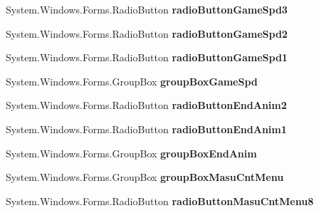 \begin{DoxyCompactItemize}
System.\+Windows.\+Forms.\+Radio\+Button {\bfseries radio\+Button\+Game\+Spd3}
\item 
\mbox{\label{class_reversi4color_form_1_1_setting_form_a2f306eccbb224464568bc234533b2216}} 
System.\+Windows.\+Forms.\+Radio\+Button {\bfseries radio\+Button\+Game\+Spd2}
\item 
\mbox{\label{class_reversi4color_form_1_1_setting_form_aeb1a9c682bde9ee4d1ff34ac0549de87}} 
System.\+Windows.\+Forms.\+Radio\+Button {\bfseries radio\+Button\+Game\+Spd1}
\item 
\mbox{\label{class_reversi4color_form_1_1_setting_form_a9005cda7371c11f4fc95868552e46cc9}} 
System.\+Windows.\+Forms.\+Group\+Box {\bfseries group\+Box\+Game\+Spd}
\item 
\mbox{\label{class_reversi4color_form_1_1_setting_form_a5a00fe38d85270b57c67ca45c7b516e0}} 
System.\+Windows.\+Forms.\+Radio\+Button {\bfseries radio\+Button\+End\+Anim2}
\item 
\mbox{\label{class_reversi4color_form_1_1_setting_form_a8e32fed47b991722279b300491c5c47e}} 
System.\+Windows.\+Forms.\+Radio\+Button {\bfseries radio\+Button\+End\+Anim1}
\item 
\mbox{\label{class_reversi4color_form_1_1_setting_form_a2df29a412d1140ff2e968d2768b1dd73}} 
System.\+Windows.\+Forms.\+Group\+Box {\bfseries group\+Box\+End\+Anim}
\item 
\mbox{\label{class_reversi4color_form_1_1_setting_form_a2c9f915aad6a094d1587707eb0bbd0b8}} 
System.\+Windows.\+Forms.\+Group\+Box {\bfseries group\+Box\+Masu\+Cnt\+Menu}
\item 
\mbox{\label{class_reversi4color_form_1_1_setting_form_adc1d76207468e50104e8816214386b4b}} 
System.\+Windows.\+Forms.\+Radio\+Button {\bfseries radio\+Button\+Masu\+Cnt\+Menu8}
\item 
\mbox{\label{class_reversi4color_form_1_1_setting_form_ace2af5fe8a316fef79f0c21088aeeaa2}} 

\end{DoxyCompactItemize}
